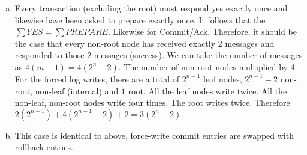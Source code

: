 \documentclass[12pt]{article}
\begin{document}
\begin{enumerate}[(a)]
    \item Every transaction (excluding the root) must respond yes exactly once and likewise have been asked to prepare exactly once. It follows that the $\sum{YES} = \sum{PREPARE}$. Likewise for Commit/Ack. Therefore, it should be the case that every non-root node has received exactly 2 messages and responded to those 2 messages (success). We can take the number of messages as $4(m-1) = 4(2^n-2)$. The number of non-root nodes multiplied by 4. For the forced log writes, there are a total of $2^{n-1}$ leaf nodes, $2^{n-1} - 2$ non-root, non-leaf (internal) and $1$ root. All the leaf nodes write twice. All the non-leaf, non-root nodes write four times. The root writes twice. Therefore $2(2^{n-1}) + 4(2^{n-1}-2) + 2 = 3(2^n - 2)$
    \item This case is identical to above, force-write commit entries are swapped with rollback entries. 
    
\end{enumerate}
\end{document}
